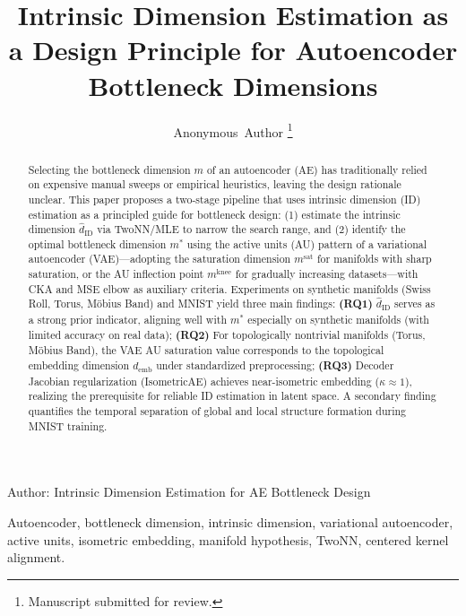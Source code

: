 \documentclass[lettersize,journal]{IEEEtran}
\begin{document}
\title{Intrinsic Dimension Estimation as a Design Principle for Autoencoder Bottleneck Dimensions}

\author{Anonymous~Author
\thanks{Manuscript submitted for review.}}

%
{Author: Intrinsic Dimension Estimation for AE Bottleneck Design}

\maketitle

\begin{abstract}
Selecting the bottleneck dimension $m$ of an autoencoder (AE) has traditionally relied on expensive manual sweeps or empirical heuristics, leaving the design rationale unclear.
This paper proposes a two-stage pipeline that uses intrinsic dimension (ID) estimation as a principled guide for bottleneck design:
(1) estimate the intrinsic dimension $\hat{d}_\mathrm{ID}$ via TwoNN/MLE to narrow the search range, and
(2) identify the optimal bottleneck dimension $m^*$ using the active units (AU) pattern of a variational autoencoder (VAE)---adopting the saturation dimension $m^\mathrm{sat}$ for manifolds with sharp saturation, or the AU inflection point $m^\mathrm{knee}$ for gradually increasing datasets---with CKA and MSE elbow as auxiliary criteria.
Experiments on synthetic manifolds (Swiss Roll, Torus, M\"{o}bius Band) and MNIST yield three main findings:
\textbf{(RQ1)} $\hat{d}_\mathrm{ID}$ serves as a strong prior indicator, aligning well with $m^*$ especially on synthetic manifolds (with limited accuracy on real data);
\textbf{(RQ2)} For topologically nontrivial manifolds (Torus, M\"{o}bius Band), the VAE AU saturation value corresponds to the topological embedding dimension $d_\mathrm{emb}$ under standardized preprocessing;
\textbf{(RQ3)} Decoder Jacobian regularization (IsometricAE) achieves near-isometric embedding ($\kappa \approx 1$), realizing the prerequisite for reliable ID estimation in latent space.
A secondary finding quantifies the temporal separation of global and local structure formation during MNIST training.
\end{abstract}

\begin{IEEEkeywords}
Autoencoder, bottleneck dimension, intrinsic dimension, variational autoencoder, active units, isometric embedding, manifold hypothesis, TwoNN, centered kernel alignment.
\end{IEEEkeywords}
\end{document}

